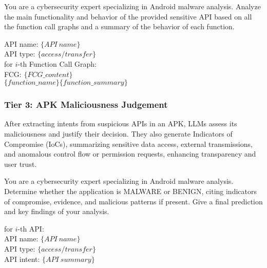 \begin{tcolorbox}[title=Tier 2: API Intent Awareness Prompt, colback=gray!20, colframe=black, colbacktitle=black, coltitle=white, sharp corners, fontupper=\small, fontlower=\small, before upper=\raggedright, before lower=\raggedright]
You are a cybersecurity expert specializing in Android malware analysis. Analyze the main functionality and behavior of the provided sensitive API based on all the function call graphs and a summary of the behavior of each function.

API name: $\{API\ name\}$ \\
API type: $\{access/transfer\}$\\
for $i$-th Function Call Graph: \\
\makebox[2em]{} FCG: $\{FCG\_content\}$ \\
\makebox[2em]{} $\{function\_name\} \{function\_summary\}$ 
\end{tcolorbox}



\subsubsection{Tier 3: APK Maliciousness Judgement}
After extracting intents from suspicious APIs in an APK, LLMs assess its maliciousness and justify their decision. They also generate Indicators of Compromise (IoCs), summarizing sensitive data access, external transmissions, and anomalous control flow or permission requests, enhancing transparency and user trust.


\begin{tcolorbox}[title=Tier 3: APK Maliciousness Judgement Prompt, colback=gray!20, colframe=black, colbacktitle=black, coltitle=white, sharp corners, fontupper=\small, fontlower=\small, before upper=\raggedright, before lower=\raggedright]
You are a cybersecurity expert specializing in Android malware analysis. Determine whether the application is MALWARE or BENIGN, citing indicators of compromise, evidence, and malicious patterns if present. Give a final prediction and key findings of your analysis.

for $i$-th API: \\
\makebox[2em]{}API name: $\{API\ name\}$ \\
\makebox[2em]{}API type: $\{access/transfer\}$\\
\makebox[2em]{}API intent: $\{API\ summary\}$
\end{tcolorbox}


